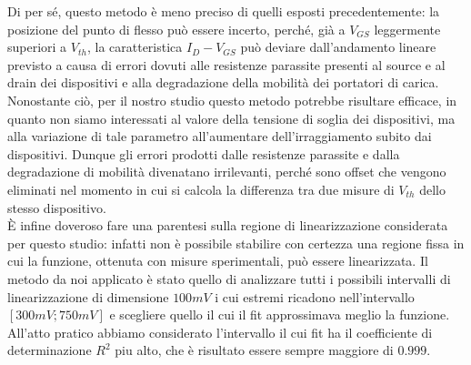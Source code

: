 \documentclass[
	a4paper,
	cleardoublepage=empty,
	headings=twolinechapter,
	numbers=autoenddot,
]{scrbook}
\begin{document}
Di per sé, questo metodo è meno preciso di quelli esposti precedentemente: la posizione del punto di flesso può essere incerto, perché, già a $V_{GS}$ leggermente superiori a $V_{th}$, la caratteristica $I_D-V_{GS}$ può deviare dall'andamento lineare previsto a causa di errori dovuti alle resistenze parassite presenti al source e al drain dei dispositivi e alla degradazione della mobilità dei portatori di carica.
Nonostante ciò, per il nostro studio questo metodo potrebbe risultare efficace, in quanto non siamo interessati al valore della tensione di soglia dei dispositivi, ma alla variazione di tale parametro all'aumentare dell'irraggiamento subito dai dispositivi. Dunque gli errori prodotti dalle resistenze parassite e dalla degradazione di mobilità divenatano irrilevanti, perché sono offset che vengono eliminati nel momento in cui si calcola la differenza tra due misure di $V_{th}$ dello stesso dispositivo.\\
È infine doveroso fare una parentesi sulla regione di linearizzazione considerata per questo studio: infatti non è possibile stabilire con certezza una regione fissa in cui la funzione, ottenuta con misure sperimentali, può essere linearizzata. Il metodo da noi applicato è stato quello di analizzare tutti i possibili intervalli di linearizzazione di dimensione $100 mV$ i cui estremi ricadono nell'intervallo $[300 mV ; 750mV]$ e scegliere quello il cui il fit approssimava meglio la funzione. All'atto pratico abbiamo considerato l'intervallo il cui fit ha il coefficiente di determinazione $R^2$ piu alto, che è risultato essere sempre maggiore di $0.999$.
\end{document}
